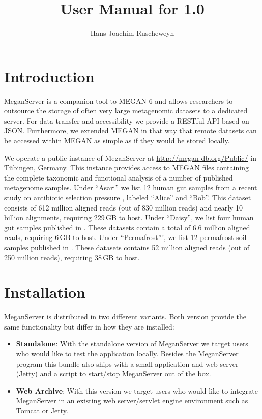 \documentclass[11pt]{article}
\title{User Manual for \sf{MeganServer}1.0}
\author{Hans-Joachim Ruscheweyh}
\begin{document}

\maketitle


{\small
\setcounter{tocdepth}{3}
\tableofcontents
}
\clearpage
\section{Introduction}


MeganServer is a companion tool to MEGAN 6 \cite{MEGAN6} and allows researchers to outsource the storage of often very large metagenomic datasets to a dedicated server. For data transfer and accessibility we provide a RESTful API based on JSON. Furthermore, we extended MEGAN in that way that remote datasets can be accessed within MEGAN as simple as if they would be stored locally.

We operate a public instance of MeganServer at  \url{http://megan-db.org/Public/}  in T\"ubingen, Germany. 
This instance provides access to MEGAN files containing the complete taxonomic and functional analysis of a number of published metagenome samples.
Under ``Asari''  we list 12 human gut samples from a recent study on antibiotic selection pressure \cite{WillmannASARI2015}, labeled ``Alice'' and ``Bob''.
This dataset consists of 612 million aligned reads (out of 830 million reads) and nearly 10 billion alignments, requiring 229\,GB to host.
Under ``Daisy'',  we list four human gut samples published in \cite{Voigt2015}. These datasets contain a total of 6.6 million aligned reads, requiring 6\,GB to host.
Under ``Permafrost''', we list 12 permafrost soil samples published in \cite{Mackelprang2011}.
These datasets  contains 52 million aligned reads (out of 250 million reads), requiring 38\,GB to host.


\section{Installation}

MeganServer is distributed in two different variants. Both version provide the same functionality but differ in how they are installed:

\begin{itemize}
\item \textbf{Standalone}: With the standalone version of MeganServer we target users who would like to test the application locally. Besides the MeganServer program this bundle also ships with a small application and web server (Jetty) and a script to start/stop MeganServer out of the box.
\item \textbf{Web Archive}: With this version we target users who would like to integrate MeganServer in an existing web server/servlet engine environment such as Tomcat or Jetty.
\end{itemize}
\end{document}

